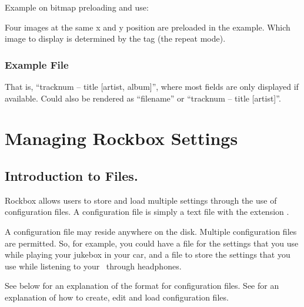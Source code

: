 Example on bitmap preloading and use:
\begin{example}
\end{example}
Four images at the same x and y position are preloaded in the example. Which 
image to display is determined by the  tag (the repeat mode).

\subsubsection{Example File}
\begin{example}
\end{example}
That is, ``tracknum -- title [artist, album]'', where most fields are only
displayed if available. Could also be rendered as ``filename'' or ``tracknum --
title [artist]''.

%  

\section{\label{ref:manage_settings}Managing Rockbox Settings}

\subsection{Introduction to  Files.}
Rockbox allows users to store and load multiple settings through the use of
configuration files. A configuration file is simply a text file with the
extension .

A configuration file may reside anywhere on the disk. Multiple
configuration files are permitted. So, for example, you could have
a  file for the settings that you use while playing your
jukebox in your car, and a  file to store the
settings that you use while listening to your \dap\ through headphones.

See  below for an explanation of the format 
for configuration files. See  for an
explanation of how to create, edit and load configuration files.


